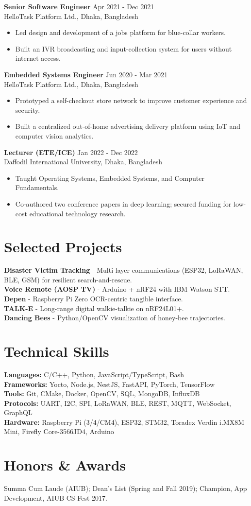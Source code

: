 \documentclass[10pt,letterpaper]{article}
\begin{document}
\textbf{Senior Software Engineer} \hfill Apr 2021 - Dec 2021\\
HelloTask Platform Ltd., Dhaka, Bangladesh
\begin{itemize}
  \item Led design and development of a jobs platform for blue-collar workers.
  \item Built an IVR broadcasting and input-collection system for users without internet access.
\end{itemize}

\textbf{Embedded Systems Engineer} \hfill Jun 2020 - Mar 2021\\
HelloTask Platform Ltd., Dhaka, Bangladesh
\begin{itemize}
  \item Prototyped a self-checkout store network to improve customer experience and security.
  \item Built a centralized out-of-home advertising delivery platform using IoT and computer vision analytics.
\end{itemize}

\textbf{Lecturer (ETE/ICE)} \hfill Jan 2022 - Dec 2022\\
Daffodil International University, Dhaka, Bangladesh
\begin{itemize}
  \item Taught Operating Systems, Embedded Systems, and Computer Fundamentals.
  \item Co-authored two conference papers in deep learning; secured funding for low-cost educational technology research.
\end{itemize}

\section*{Selected Projects}
\textbf{Disaster Victim Tracking} - Multi-layer communications (ESP32, LoRaWAN, BLE, GSM) for resilient search-and-rescue.\\
\textbf{Voice Remote (AOSP TV)} - Arduino + nRF24 with IBM Watson STT.\\
\textbf{Depen} - Raspberry Pi Zero OCR-centric tangible interface.\\
\textbf{TALK-E} - Long-range digital walkie-talkie on nRF24L01+.\\
\textbf{Dancing Bees} - Python/OpenCV visualization of honey-bee trajectories.

\section*{Technical Skills}
\textbf{Languages:} C/C++, Python, JavaScript/TypeScript, Bash \\
\textbf{Frameworks:} Yocto, Node.js, NestJS, FastAPI, PyTorch, TensorFlow \\
\textbf{Tools:} Git, CMake, Docker, OpenCV, SQL, MongoDB, InfluxDB \\
\textbf{Protocols:} UART, I2C, SPI, LoRaWAN, BLE, REST, MQTT, WebSocket, GraphQL \\
\textbf{Hardware:} Raspberry Pi (3/4/CM4), ESP32, STM32, Toradex Verdin i.MX8M Mini, Firefly Core-3566JD4, Arduino

\section*{Honors \& Awards}
Summa Cum Laude (AIUB); Dean's List (Spring and Fall 2019); Champion, App Development, AIUB CS Fest 2017.
\end{document}
